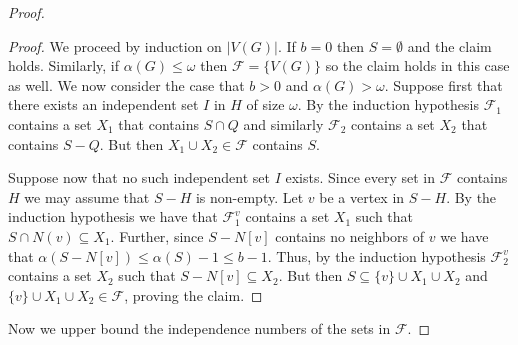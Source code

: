 \documentclass[10pt,a4paper]{amsart}
\newcommand{\cal}{\mathcal}
\begin{document}
\begin{proof}
%

\begin{proof}
We proceed by induction on $|V(G)|$. If $b=0$ then $S=\emptyset$ and the claim holds. 
Similarly, if $\alpha(G) \leq \omega$ then ${\cal F}=\{V(G)\}$ so the claim holds in this case as well.
%
We now consider the case that $b > 0$ and $\alpha(G) > \omega$.
%
Suppose first that there exists an independent set $I$ in $H$ of size $\omega$. By the induction hypothesis ${\cal F}_1$ contains a set $X_1$ that contains $S \cap Q$ and similarly ${\cal F}_2$ contains a set $X_2$ that contains $S - Q$. But then $X_1 \cup X_2 \in {\cal F}$ contains $S$. 

Suppose now that no such independent set $I$ exists. 
Since every set in ${\cal F}$ contains $H$ we may assume that $S - H$ is non-empty. 
Let $v$ be a vertex in $S - H$. 
%
By the induction hypothesis we have that ${\cal F}_1^v$ contains a set $X_1$ such that $S \cap N(v) \subseteq X_1$. Further, since $S - N[v]$ contains no neighbors of $v$ we have that $\alpha(S - N[v]) \leq \alpha(S) - 1 \leq b - 1$. Thus, by the induction hypothesis 
 ${\cal F}_2^v$ contains a set $X_2$ such that $S - N[v] \subseteq X_2$.
But then $S \subseteq \{v\} \cup X_1 \cup X_2$ and $\{v\} \cup X_1 \cup X_2 \in {\cal F}$, proving the claim.
\end{proof}

Now we upper bound the independence numbers of the sets in ${\cal F}$.


\end{proof}
\end{document}
